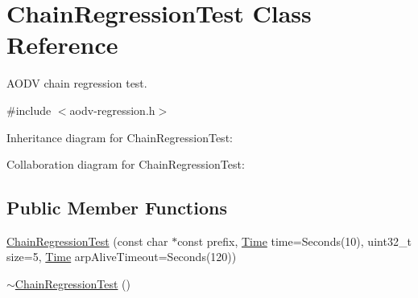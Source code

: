 \hypertarget{classChainRegressionTest}{}\section{Chain\+Regression\+Test Class Reference}
\label{classChainRegressionTest}


A\+O\+DV chain regression test.  




{\ttfamily \#include $<$aodv-\/regression.\+h$>$}



Inheritance diagram for Chain\+Regression\+Test\+:


Collaboration diagram for Chain\+Regression\+Test\+:
\subsection*{Public Member Functions}
\begin{DoxyCompactItemize}
\item 
\hyperlink{classChainRegressionTest_a8a8ec4fcbd87704170cfd1480d94f78f}{Chain\+Regression\+Test} (const char $\ast$const prefix, \hyperlink{classns3_1_1Time}{Time} time=Seconds(10), uint32\+\_\+t size=5, \hyperlink{classns3_1_1Time}{Time} arp\+Alive\+Timeout=Seconds(120))
\item 
\hyperlink{classChainRegressionTest_a937f02ea087e319697e192f1c7ee5123}{$\sim$\+Chain\+Regression\+Test} ()
\end{DoxyCompactItemize}
